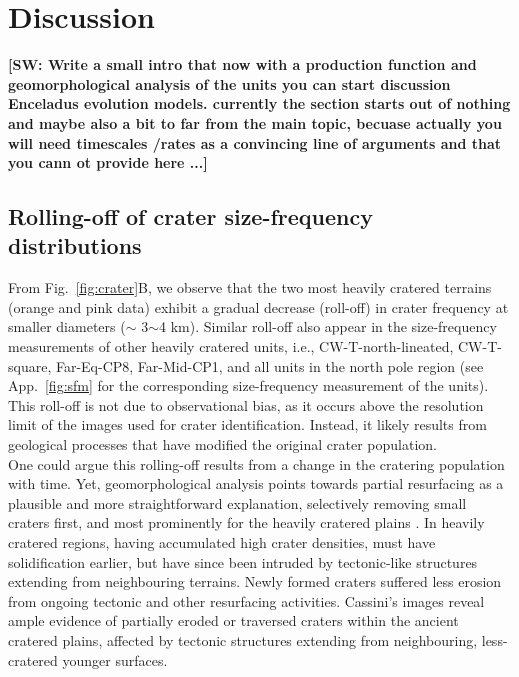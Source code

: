 \documentclass[preprint,11pt,3p,times,authoryear]{elsarticle}
\begin{document}
{%

\section{Discussion}
\label{sec:discussion}
\textbf{[SW: Write a small intro that now with a production function and geomorphological analysis of the units you can start discussion Enceladus evolution models.
currently the section starts out of nothing and maybe also a bit to far from the main topic, becuase actually you will need timescales /rates as a convincing line of arguments and that you cann ot provide here ...]\\}



\subsection{Rolling-off of crater size-frequency distributions}
\label{subsec:rolloff}
From Fig.~\ref{fig:crater}B, we observe that the two most heavily cratered terrains (orange and pink data) exhibit a gradual decrease (roll-off) in crater frequency at smaller diameters ($\sim$ 3$\sim$4 km). Similar roll-off also appear in the size-frequency measurements of other heavily cratered units, i.e., CW-T-north-lineated, CW-T-square, Far-Eq-CP8, Far-Mid-CP1, and all units in the north pole region (see App.~\ref{fig:sfm} for the corresponding size-frequency measurement of the units). 
This roll-off is not due to observational bias, as it occurs above the resolution limit of the images used for crater identification.
Instead, it likely results from geological processes that have modified the original crater population.\\

One could argue this rolling-off results from a change in the cratering population with time. Yet, geomorphological analysis points towards partial resurfacing as a plausible and more straightforward explanation, selectively removing small craters first, and most prominently for the heavily cratered plains \citep{Michael2010}. In heavily cratered regions, having accumulated high crater densities, must have solidification earlier, but have since been intruded by tectonic-like structures extending from neighbouring terrains. Newly formed craters suffered less erosion from ongoing tectonic and other resurfacing activities. Cassini’s images reveal ample evidence of partially eroded or traversed craters within the ancient cratered plains, affected by tectonic structures extending from neighbouring, less-cratered younger surfaces. \\

}
\end{document}
